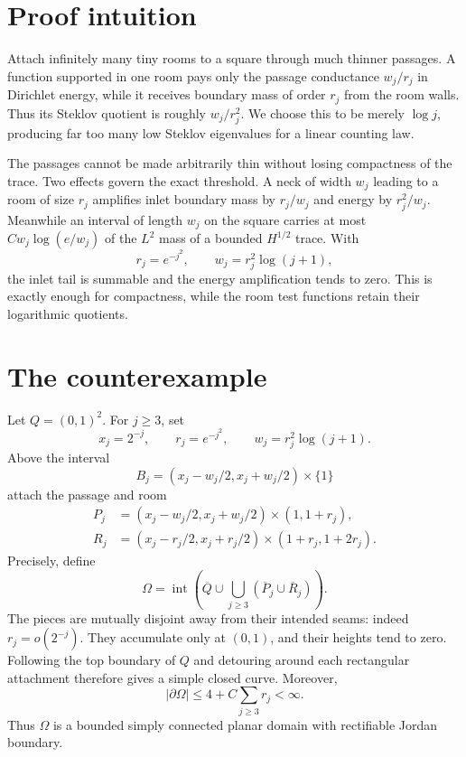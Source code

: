 \documentclass[11pt]{article}
\newcommand{\Om}{\Omega}
\begin{document}
\section{Proof intuition}

Attach infinitely many tiny rooms to a square through much thinner passages.
A function supported in one room pays only the passage conductance
$w_j/r_j$ in Dirichlet energy, while it receives boundary mass of order
$r_j$ from the room walls.  Thus its Steklov quotient is roughly
$w_j/r_j^2$.  We choose this to be merely $\log j$, producing far too many
low Steklov eigenvalues for a linear counting law.

The passages cannot be made arbitrarily thin without losing compactness of
the trace.  Two effects govern the exact threshold.  A neck of width $w_j$
leading to a room of size $r_j$ amplifies inlet boundary mass by $r_j/w_j$
and energy by $r_j^2/w_j$.  Meanwhile an interval of length $w_j$ on the
square carries at most $Cw_j\log(e/w_j)$ of the $L^2$ mass of a bounded
$H^{1/2}$ trace.  With
\[
 r_j=e^{-j^2},\qquad w_j=r_j^2\log(j+1),
\]
the inlet tail is summable and the energy amplification tends to zero.  This
is exactly enough for compactness, while the room test functions retain their
logarithmic quotients.

\section{The counterexample}

Let $Q=(0,1)^2$.  For $j\ge3$, set
\begin{equation}\label{eq:parameters}
 x_j=2^{-j},\qquad r_j=e^{-j^2},\qquad
 w_j=r_j^2\log(j+1).
\end{equation}
Above the interval
\[
 B_j=(x_j-w_j/2,x_j+w_j/2)\times\{1\}
\]
attach the passage and room
\begin{align*}
 P_j&=(x_j-w_j/2,x_j+w_j/2)\times(1,1+r_j),\\
 R_j&=(x_j-r_j/2,x_j+r_j/2)\times(1+r_j,1+2r_j).
\end{align*}
Precisely, define
\begin{equation}\label{eq:domain}
 \Om=\operatorname{int}\!\left(
 \overline Q\cup\bigcup_{j\ge3}(\overline P_j\cup\overline R_j)
 \right).
\end{equation}
The pieces are mutually disjoint away from their intended seams: indeed
$r_j=o(2^{-j})$.  They accumulate only at $(0,1)$, and their heights tend to
zero.  Following the top boundary of $Q$ and detouring around each rectangular
attachment therefore gives a simple closed curve.  Moreover,
\[
 |\partial\Om|\le 4+C\sum_{j\ge3}r_j<\infty.
\]
Thus $\Om$ is a bounded simply connected planar domain with rectifiable
Jordan boundary.
\end{document}
